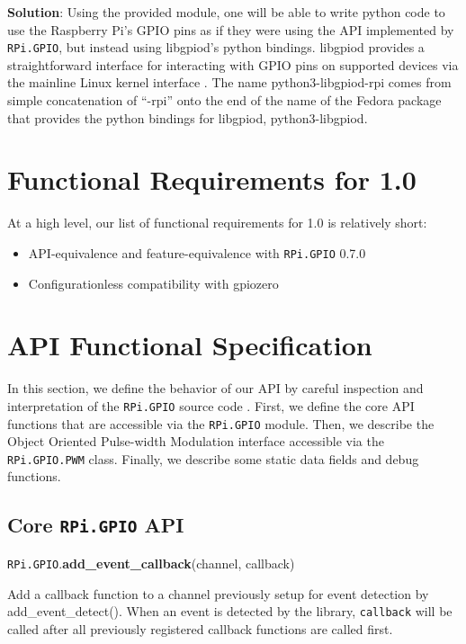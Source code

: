 \documentclass[12pt]{article}
\begin{document}
\textbf{Solution}:
Using the provided module, one will be able to write python code to use the Raspberry Pi's GPIO pins as if they were using the API implemented by \texttt{RPi.GPIO}, but instead using libgpiod's python bindings. libgpiod provides a straightforward interface for interacting with GPIO pins on supported devices via the mainline Linux kernel interface \cite{libgpiod}. The name python3-libgpiod-rpi comes from simple concatenation of ``-rpi'' onto the end of the name of the Fedora package that provides the python bindings for libgpiod, python3-libgpiod.



\section{Functional Requirements for 1.0}

At a high level, our list of functional requirements for 1.0 is relatively short:
\begin{itemize}
    \item API-equivalence and feature-equivalence with \texttt{RPi.GPIO} 0.7.0
    \item Configurationless compatibility with gpiozero \cite{gpiozero}
\end{itemize}

\section{API Functional Specification}

In this section, we define the behavior of our API by careful inspection and interpretation of the \texttt{RPi.GPIO} source code \cite{rpigpio}.
First, we define the core API functions that are accessible via the \texttt{RPi.GPIO} module.
Then, we describe the Object Oriented Pulse-width Modulation interface accessible via the \texttt{RPi.GPIO.PWM} class. Finally, we describe some static data fields and debug functions.

\subsection{Core \texttt{RPi.GPIO} API} \label{coreapi}
 
\texttt{RPi.GPIO}.\textbf{add\_event\_callback}(channel, callback)



Add a callback function to a channel previously setup for event detection by add\_event\_detect(). When an event is detected by the library, \texttt{callback} will be called after all previously registered callback functions are called first.
\end{document}
